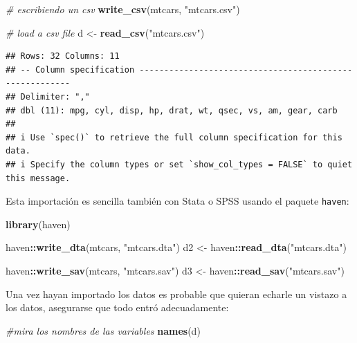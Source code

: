 \documentclass[
]{article}
\newenvironment{Shaded}{\begin{snugshade}}{\end{snugshade}}
\newcommand{\CommentTok}[1]{\textcolor[rgb]{0.56,0.35,0.01}{\textit{#1}}}
\newcommand{\FunctionTok}[1]{\textcolor[rgb]{0.13,0.29,0.53}{\textbf{#1}}}
\newcommand{\NormalTok}[1]{#1}
\newcommand{\OtherTok}[1]{\textcolor[rgb]{0.56,0.35,0.01}{#1}}
\newcommand{\SpecialCharTok}[1]{\textcolor[rgb]{0.81,0.36,0.00}{\textbf{#1}}}
\newcommand{\StringTok}[1]{\textcolor[rgb]{0.31,0.60,0.02}{#1}}
\begin{document}
\begin{Shaded}
\begin{Highlighting}[]
\CommentTok{\# escribiendo un csv}
\FunctionTok{write\_csv}\NormalTok{(mtcars, }\StringTok{"mtcars.csv"}\NormalTok{)}

\CommentTok{\# load a csv file}
\NormalTok{d }\OtherTok{\textless{}{-}} \FunctionTok{read\_csv}\NormalTok{(}\StringTok{"mtcars.csv"}\NormalTok{)}
\end{Highlighting}
\end{Shaded}

\begin{verbatim}
## Rows: 32 Columns: 11
## -- Column specification --------------------------------------------------------
## Delimiter: ","
## dbl (11): mpg, cyl, disp, hp, drat, wt, qsec, vs, am, gear, carb
## 
## i Use `spec()` to retrieve the full column specification for this data.
## i Specify the column types or set `show_col_types = FALSE` to quiet this message.
\end{verbatim}

Esta importación es sencilla también con Stata o SPSS usando el paquete
\texttt{haven}:

\begin{Shaded}
\begin{Highlighting}[]
\FunctionTok{library}\NormalTok{(haven)}

\NormalTok{haven}\SpecialCharTok{::}\FunctionTok{write\_dta}\NormalTok{(mtcars, }\StringTok{"mtcars.dta"}\NormalTok{)}
\NormalTok{d2 }\OtherTok{\textless{}{-}}\NormalTok{ haven}\SpecialCharTok{::}\FunctionTok{read\_dta}\NormalTok{(}\StringTok{"mtcars.dta"}\NormalTok{)}

\NormalTok{haven}\SpecialCharTok{::}\FunctionTok{write\_sav}\NormalTok{(mtcars, }\StringTok{"mtcars.sav"}\NormalTok{)}
\NormalTok{d3 }\OtherTok{\textless{}{-}}\NormalTok{ haven}\SpecialCharTok{::}\FunctionTok{read\_sav}\NormalTok{(}\StringTok{"mtcars.sav"}\NormalTok{)}
\end{Highlighting}
\end{Shaded}

Una vez hayan importado los datos es probable que quieran echarle un
vistazo a los datos, asegurarse que todo entró adecuadamente:

\begin{Shaded}
\begin{Highlighting}[]
\CommentTok{\#mira los nombres de las variables}
\FunctionTok{names}\NormalTok{(d)}
\end{Highlighting}
\end{Shaded}
\end{document}
